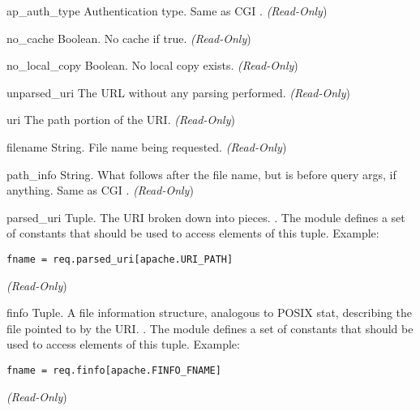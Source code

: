 \begin{memberdesc}[Request]{ap_auth_type}
Authentication type. Same as CGI .
\emph{(Read-Only})
\end{memberdesc}

\begin{memberdesc}[Request]{no_cache}
Boolean. No cache if true.
\emph{(Read-Only})
\end{memberdesc}

\begin{memberdesc}[Request]{no_local_copy}
Boolean. No local copy exists.
\emph{(Read-Only})
\end{memberdesc}

\begin{memberdesc}[Request]{unparsed_uri}
The URL without any parsing performed.
\emph{(Read-Only})
\end{memberdesc}

\begin{memberdesc}[Request]{uri}
The path portion of the URI.
\emph{(Read-Only})
\end{memberdesc}

\begin{memberdesc}[Request]{filename}
String. File name being requested.
\emph{(Read-Only})
\end{memberdesc}

\begin{memberdesc}[Request]{path_info}
String. What follows after the file name, but is before query args, if
anything. Same as CGI .
\emph{(Read-Only})
\end{memberdesc}

\begin{memberdesc}[Request]{parsed_uri}
Tuple. The URI broken down into pieces.
. 
The  module defines a set of  constants that
should be used to access elements of this tuple. Example:
\begin{verbatim}
fname = req.parsed_uri[apache.URI_PATH]
\end{verbatim}
\emph{(Read-Only})
\end{memberdesc}

\begin{memberdesc}[Request]{finfo}
Tuple. A file information structure, analogous to POSIX stat, describing the file pointed to
by the URI.
. The  module defines a set of  constants that
should be used to access elements of this tuple. Example:
\begin{verbatim}
fname = req.finfo[apache.FINFO_FNAME]
\end{verbatim}
\emph{(Read-Only})
\end{memberdesc}

